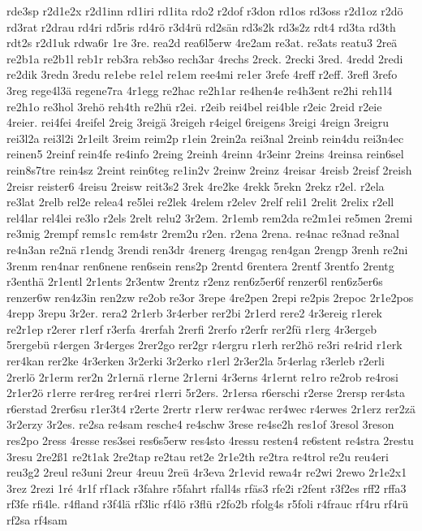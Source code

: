 {rde3sp
r2d1e2x
r2d1inn
rd1iri
rd1ita
rdo2
r2dof
r3don
rd1os
rd3oss
r2d1oz
r2dö
rd3rat
r2drau
rd4ri
rd5ris
rd4rö
r3d4rü
rd2sän
rd3s2k
rd3s2z
rdt4
rd3ta
rd3th
rdt2s
r2d1uk
rdwa6r
1re
3re.
rea2d
rea6l5erw
4re2am
re3at.
re3ats
reatu3
2reä
re2b1a
re2b1l
reb1r
reb3ra
reb3so
rech3ar
4rechs
2reck.
2recki
3red.
4redd
2redi
re2dik
3redn
3redu
re1ebe
re1el
re1em
ree4mi
re1er
3refe
4reff
r2eff.
3refl
3refo
3reg
rege4l3ä
regene7ra
4r1egg
re2hac
re2h1ar
re4hen4e
re4h3ent
re2hi
reh1l4
re2h1o
re3hol
3rehö
reh4th
re2hü
r2ei.
r2eib
rei4bel
rei4ble
r2eic
2reid
r2eie
4reier.
rei4fei
4reifel
2reig
3reigä
3reigeh
r4eigel
6reigens
3reigi
4reign
3reigru
rei3l2a
rei3l2i
2r1eilt
3reim
reim2p
r1ein
2rein2a
rei3nal
2reinb
rein4du
rei3n4ec
reinen5
2reinf
rein4fe
re4info
2reing
2reinh
4reinn
4r3einr
2reins
4reinsa
rein6sel
rein8s7tre
rein4sz
2reint
rein6teg
re1in2v
2reinw
2reinz
4reisar
4reisb
2reisf
2reish
2reisr
reister6
4reisu
2reisw
reit3s2
3rek
4re2ke
4rekk
5rekn
2rekz
r2el.
r2ela
re3lat
2relb
rel2e
relea4
re5lei
re2lek
4relem
r2elev
2relf
reli1
2relit
2relix
r2ell
rel4lar
rel4lei
re3lo
r2els
2relt
relu2
3r2em.
2r1emb
rem2da
re2m1ei
re5men
2remi
re3mig
2rempf
rems1c
rem4str
2rem2u
r2en.
r2ena
2rena.
re4nac
re3nad
re3nal
re4n3an
re2nä
r1endg
3rendi
ren3dr
4renerg
4rengag
ren4gan
2rengp
3renh
re2ni
3renm
ren4nar
ren6nene
ren6sein
rens2p
2rentd
6rentera
2rentf
3rentfo
2rentg
r3enthä
2r1entl
2r1ents
2r3entw
2rentz
r2enz
ren6z5er6f
renzer6l
ren6z5er6s
renzer6w
ren4z3in
ren2zw
re2ob
re3or
3repe
4re2pen
2repi
re2pis
2repoc
2r1e2pos
4repp
3repu
3r2er.
rera2
2r1erb
3r4erber
rer2bi
2r1erd
rere2
4r3ereig
r1erek
re2r1ep
r2erer
r1erf
r3erfa
4rerfah
2rerfi
2rerfo
r2erfr
rer2fü
r1erg
4r3ergeb
5rergebü
r4ergen
3r4erges
2rer2go
rer2gr
r4ergru
r1erh
rer2hö
re3ri
re4rid
r1erk
rer4kan
rer2ke
4r3erken
3r2erki
3r2erko
r1erl
2r3er2la
5r4erlag
r3erleb
r2erli
2rerlö
2r1erm
rer2n
2r1ernä
r1erne
2r1erni
4r3erns
4r1ernt
re1ro
re2rob
re4rosi
2r1er2ö
r1erre
rer4reg
rer4rei
r1erri
5r2ers.
2r1ersa
r6erschi
r2erse
2rersp
rer4sta
r6erstad
2rer6su
r1er3t4
r2erte
2rertr
r1erw
rer4wac
rer4wec
r4erwes
2r1erz
rer2zä
3r2erzy
3r2es.
re2sa
re4sam
resche4
re4schw
3rese
re4se2h
res1of
3resol
3reson
res2po
2ress
4resse
res3sei
res6s5erw
res4sto
4ressu
resten4
re6stent
re4stra
2restu
3resu
2re2ß1
re2t1ak
2re2tap
re2tau
ret2e
2r1e2th
re2tra
re4trol
re2u
reu4eri
reu3g2
2reul
re3uni
2reur
4reuu
2reü
4r3eva
2r1evid
rewa4r
re2wi
2rewo
2r1e2x1
3rez
2rezi
1ré
4r1f
rf1ack
r3fahre
r5fahrt
rfall4s
rfäs3
rfe2i
r2fent
r3f2es
rff2
rffa3
rf3fe
rfi4le.
r4fland
r3f4lä
rf3lic
rf4lö
r3flü
r2fo2b
rfolg4s
r5foli
r4frauc
rf4ru
rf4rü
rf2sa
rf4sam
}

